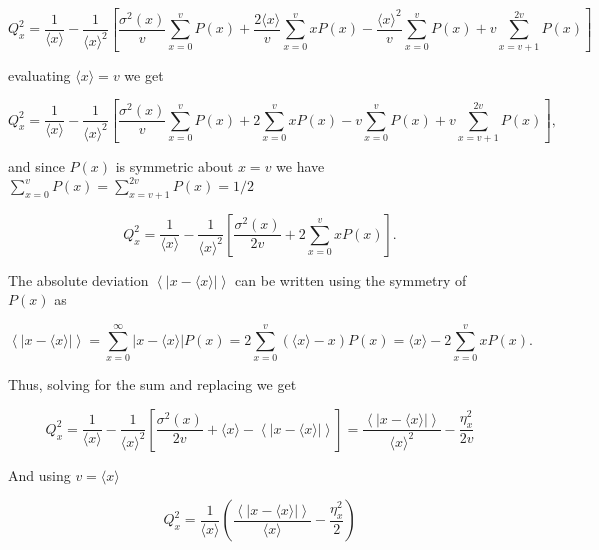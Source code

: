 \begin{equation*}
  Q_x^2 = \frac{1}{\langle x\rangle}-\frac{1}{\langle x\rangle^2}\left[\frac{\sigma^2(x)}{v}\sum_{x=0}^vP(x)+\frac{2\langle x\rangle}{v}\sum_{x=0}^vxP(x)-\frac{\langle x\rangle^2}{v}\sum_{x=0}^vP(x)+v\sum_{x=v+1}^{2v}P(x)\right]
\end{equation*}

evaluating $\langle x\rangle = v$ we get

\begin{equation*}
  Q_x^2 = \frac{1}{\langle x\rangle}-\frac{1}{\langle x\rangle^2}\left[\frac{\sigma^2(x)}{v}\sum_{x=0}^vP(x)+2\sum_{x=0}^vxP(x)-v\sum_{x=0}^vP(x)+v\sum_{x=v+1}^{2v}P(x)\right],
\end{equation*}

and since $P(x)$ is symmetric about $x=v$ we have $\sum_{x=0}^vP(x) = \sum_{x=v+1}^{2v}P(x) = 1/2$

\begin{equation}
  Q_x^2 = \frac{1}{\langle x\rangle}-\frac{1}{\langle x\rangle^2}\left[\frac{\sigma^2(x)}{2v}+2\sum_{x=0}^vxP(x)\right].
\end{equation}

The absolute deviation $\left\langle\left|x-\langle x\rangle\right|\right\rangle$ can be written using the symmetry of $P(x)$ as

\begin{equation}
  \left\langle\left|x-\langle x\rangle\right|\right\rangle = \sum_{x=0}^\infty\left|x-\langle x\rangle\right|P(x) = 2\sum_{x=0}^v\left(\langle x\rangle-x\right)P(x) = \langle x\rangle-2\sum_{x=0}^vxP(x).
\end{equation}

Thus, solving for the sum and replacing we get

\begin{equation*}
  Q_x^2 = \frac{1}{\langle x\rangle}-\frac{1}{\langle x\rangle^2}\left[\frac{\sigma^2(x)}{2v}+\langle x\rangle-\left\langle\left|x-\langle x\rangle\right|\right\rangle\right] = \frac{\left\langle\left|x-\langle x\rangle\right|\right\rangle}{\langle x\rangle^2}-\frac{\eta_x^2}{2v}
\end{equation*}

And using $v=\langle x\rangle$

\begin{equation}
  \boxed{Q_x^2 = \frac{1}{\langle x\rangle}\left(\frac{\left\langle\left|x-\langle x\rangle\right|\right\rangle}{\langle x\rangle}-\frac{\eta_x^2}{2}\right)}
\end{equation}

